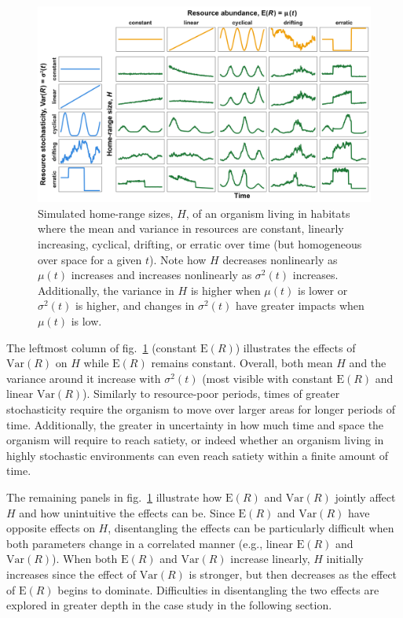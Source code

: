 \documentclass[
  12pt,
]{article}
\begin{document}
\begin{figure}

{\centering \includegraphics[width=1\linewidth]{../figures/mean-variance-5-by-5-hr-sims} 

}

\caption{Simulated home-range sizes, $H$, of an organism living in habitats where the mean and variance in resources are constant, linearly increasing, cyclical, drifting, or erratic over time (but homogeneous over space for a given $t$). Note how $H$ decreases nonlinearly as $\mu(t)$ increases and increases nonlinearly as $\sigma^2(t)$ increases. Additionally, the variance in $H$ is higher when $\mu(t)$ is lower or $\sigma^2(t)$ is higher, and changes in $\sigma^2(t)$ have greater impacts when $\mu(t)$ is low.}\label{fig:5-5-sims}
\end{figure}

The leftmost column of fig.~\ref{fig:5-5-sims} (constant \(\text{E}(R)\)) illustrates the effects of \(\text{Var}(R)\) on \(H\) while \(\text{E}(R)\) remains constant. Overall, both mean \(H\) and the variance around it increase with \(\sigma^2(t)\) (most visible with constant \(\text{E}(R)\) and linear \(\text{Var}(R)\)). Similarly to resource-poor periods, times of greater stochasticity require the organism to move over larger areas for longer periods of time. Additionally, the greater in uncertainty in how much time and space the organism will require to reach satiety, or indeed whether an organism living in highly stochastic environments can even reach satiety within a finite amount of time.

The remaining panels in fig.~\ref{fig:5-5-sims} illustrate how \(\text{E}(R)\) and \(\text{Var}(R)\) jointly affect \(H\) and how unintuitive the effects can be. Since \(\text{E}(R)\) and \(\text{Var}(R)\) have opposite effects on \(H\), disentangling the effects can be particularly difficult when both parameters change in a correlated manner (e.g., linear \(\text{E}(R)\) and \(\text{Var}(R)\)). When both \(\text{E}(R)\) and \(\text{Var}(R)\) increase linearly, \(H\) initially increases since the effect of \(\text{Var}(R)\) is stronger, but then decreases as the effect of \(\text{E}(R)\) begins to dominate. Difficulties in disentangling the two effects are explored in greater depth in the case study in the following section.
\end{document}
